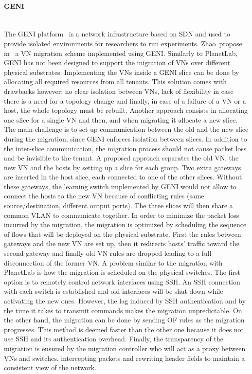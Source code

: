 \paragraph{GENI} \textbf{\\}The GENI platform~\cite{GENI-Berman2014} is a network infrastructure based on SDN and used to provide isolated environments for researchers to run experiments.
Zhao~\etal propose in~\cite{Zhao2017} a VN migration scheme implemented using GENI. Similarly to PlanetLab, GENI has not been designed to support the migration of VNs over different physical substrates. Implementing the VNs inside a GENI slice can be done by allocating all required resources from all tenants. This solution comes with drawbacks however: no clear isolation between VNs, lack of flexibility in case there is a need for a topology change and finally, in case of a failure of a VN or a host, the whole topology must be rebuilt.
Another approach consists in allocating one slice for a single VN and then, and when migrating it allocate a new slice. The main challenge is to set up communication between the old and the new slice during the migration, since GENI enforces isolation between slices.
In addition to the inter-slice communication, the migration process should not cause packet loss and be invisible to the tenant.
A proposed approach separates the old VN, the new VN and the hosts by setting up a slice for each group. Two extra gateways are inserted in the host slice, each connected to one of the other slices.
Without these gateways, the learning switch implemented by GENI would not allow to connect the hosts to the new VN because of conflicting rules (same source/destination, different output ports).
The three slices will then share a common VLAN to communicate together.
In order to minimize the packet loss incurred by the migration, the migration is optimized by scheduling the sequence of flows that will be deployed on the physical substrate.
First the rules between gateways and the new VN are set up, then it redirects hosts' traffic toward the second gateway and finally old VN rules are dropped leading to a full disconnection of the former VN.
A problem similar to the migration with PlanetLab is how the migration is scheduled on the physical switches.
The first option is to remotely control network interfaces using SSH.
An SSH connection with each switch is established and old interfaces will be shut down while activating the new ones.
However, the lag induced by SSH authentication and by the time it takes to transmit commands makes the migration unpredictable.
On the other hand, the migration can be done by sending OF rules as the migration progresses. This method is deemed faster than the other one because it does not use SSH and its authentication overhead.
Finally, the transparency of the migration is ensured by the migration controller who will act as a proxy between VNs and switches, intercepting packets and rewriting header fields to maintain a consistent view of the network.

